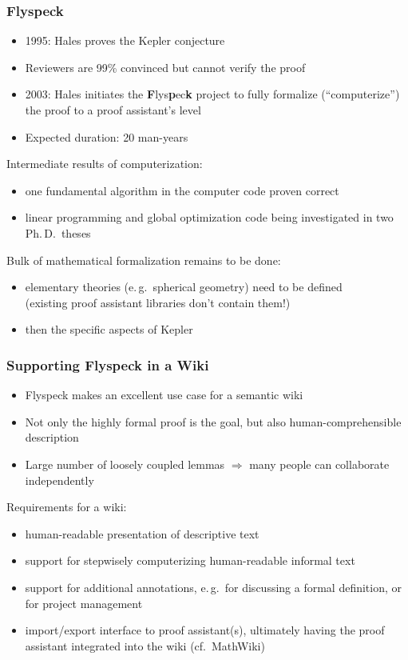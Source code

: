 \documentclass[pdftex]{beamer}
\begin{document}
\begin{frame}
  \frametitle{Flyspeck}
  \begin{itemize}
  \item 1995: Hales proves the Kepler conjecture
  \item Reviewers are 99\% convinced but cannot verify the proof
  \item 2003: Hales initiates the \textbf{F}lys\textbf{p}ec\textbf{k} project to
    fully formalize (``computerize'') the proof to a proof assistant's level
  \item Expected duration: 20 man-years
  \end{itemize}
  Intermediate results of computerization:
  \begin{itemize}
  \item one fundamental algorithm in the computer code proven correct
  \item linear programming and global optimization code being investigated in
    two Ph.\,D.\ theses
  \end{itemize}
  Bulk of mathematical formalization remains to be done:
  \begin{itemize}
  \item elementary theories (e.\,g.\ spherical geometry) need to be defined\\
    (existing proof assistant libraries don't contain them!)
  \item then the specific aspects of Kepler
  \end{itemize}
\end{frame}

\begin{frame}
  \frametitle{Supporting Flyspeck in a Wiki}
  \begin{itemize}
  \item Flyspeck makes an excellent use case for a semantic wiki
  \item Not only the highly formal proof is the goal, but also
    human-comprehensible description
  \item Large number of loosely coupled lemmas $\Rightarrow$ many people can
    collaborate independently
  \end{itemize}
  Requirements for a wiki:
  \begin{itemize}
  \item human-readable presentation of descriptive text
  \item support for stepwisely computerizing human-readable informal text
  \item support for additional annotations, e.\,g.\ for discussing a formal
    definition, or for project management
  \item import/export interface to proof assistant(s), ultimately having the
    proof assistant integrated into the wiki (cf.\ MathWiki)
  \end{itemize}
\end{frame}
\end{document}
